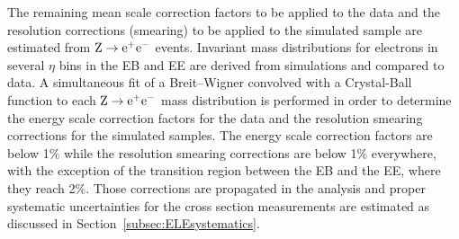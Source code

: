 \par
%
%
%
The remaining mean scale correction factors to be applied to the data and the
resolution corrections (smearing) to be applied to the simulated sample
are estimated from $\mathrm{Z} \rightarrow \mathrm{e}^+\mathrm{e}^-$ events. Invariant mass distributions for electrons
in several $\eta$ bins in the EB and EE are derived
from simulations and compared to data. A simultaneous fit of a Breit--Wigner convolved with a
Crystal-Ball function to each $\mathrm{Z} \rightarrow \mathrm{e}^+\mathrm{e}^-$ mass distribution is performed  in order
to determine the energy scale correction factors for the data and the resolution
smearing corrections for the simulated samples. The energy scale correction
factors are below 1$\%$ while the resolution smearing corrections are below 1$\%$
everywhere, with the exception of the transition region between the EB and the EE,
where they reach 2$\%$.
Those corrections are propagated in the analysis and proper systematic uncertainties
for the cross section measurements are estimated as discussed in Section~\ref{subsec:ELEsystematics}.
%
%
%

